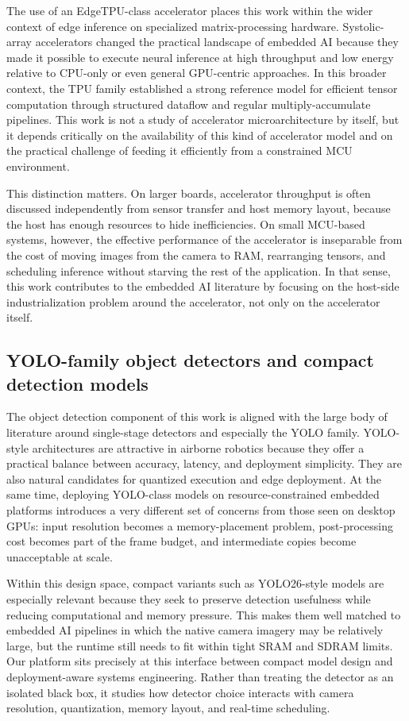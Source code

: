 The use of an EdgeTPU-class accelerator places this work within the
wider context of edge inference on specialized matrix-processing
hardware. Systolic-array accelerators changed the practical landscape of
embedded AI because they made it possible to execute neural inference at
high throughput and low energy relative to CPU-only or even general
GPU-centric approaches. In this broader context, the TPU family
established a strong reference model for efficient tensor computation
through structured dataflow and regular multiply-accumulate pipelines.
This work is not a study of accelerator microarchitecture by itself, but
it depends critically on the availability of this kind of accelerator
model and on the practical challenge of feeding it efficiently from a
constrained MCU environment.

This distinction matters. On larger boards, accelerator throughput is
often discussed independently from sensor transfer and host memory
layout, because the host has enough resources to hide inefficiencies. On
small MCU-based systems, however, the effective performance of the
accelerator is inseparable from the cost of moving images from the
camera to RAM, rearranging tensors, and scheduling inference without
starving the rest of the application. In that sense, this work
contributes to the embedded AI literature by focusing on the host-side
industrialization problem around the accelerator, not only on the
accelerator itself.

\subsection{YOLO-family object detectors and compact detection
models}\label{yolo-family-object-detectors-and-compact-detection-models}

The object detection component of this work is aligned with the large
body of literature around single-stage detectors and especially the YOLO
family. YOLO-style architectures are attractive in airborne robotics
because they offer a practical balance between accuracy, latency, and
deployment simplicity. They are also natural candidates for quantized
execution and edge deployment. At the same time, deploying YOLO-class
models on resource-constrained embedded platforms introduces a very
different set of concerns from those seen on desktop GPUs: input
resolution becomes a memory-placement problem, post-processing cost
becomes part of the frame budget, and intermediate copies become
unacceptable at scale.

Within this design space, compact variants such as YOLO26-style models
are especially relevant because they seek to preserve detection
usefulness while reducing computational and memory pressure. This makes
them well matched to embedded AI pipelines in which the native camera
imagery may be relatively large, but the runtime still needs to fit
within tight SRAM and SDRAM limits. Our platform sits precisely at this
interface between compact model design and deployment-aware systems
engineering. Rather than treating the detector as an isolated black box,
it studies how detector choice interacts with camera resolution,
quantization, memory layout, and real-time scheduling.

